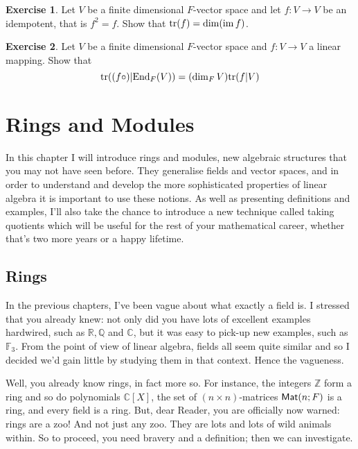 \documentclass[11pt]{amsbook}
\DeclareMathOperator{\im}{\mathrm{im}}
\theoremstyle{definition}
\newtheorem{exercise}{Exercise}
\begin{document}
\begin{exercise}
Let $V$ be a finite dimensional $F$-vector space and let $f:V\to V$ be an idempotent, that is $f^2 = f$. Show that ${\rm tr}(f) = \dim (\im f)$.
\end{exercise}

\begin{exercise}
Let $V$ be a finite dimensional $F$-vector space and $f:V \to V$ a linear mapping. Show that $${\rm tr}((f\circ )|{\rm End}_F(V)) = (\dim_F V){\rm tr}(f|V)$$
\end{exercise}
\chapter{Rings and Modules}
In this chapter I will introduce rings and modules, new algebraic structures that you may not have seen before. They generalise fields and vector spaces, and in order to understand and develop the more sophisticated properties of linear algebra it is important to use these notions. As well as presenting definitions and examples, I'll also take the chance to introduce a new technique called taking quotients which will be useful for the rest of your mathematical career, whether that's two more years or a happy lifetime.

\section{Rings}
In the previous chapters, I've been vague about what exactly a field is. I stressed that you already knew: not only did you have lots of excellent examples hardwired, such as $\mathbb{R}, \mathbb{Q}$ and $\mathbb{C}$, but it was easy to pick-up new examples, such as $\mathbb{F}_3$. From the point of view of linear algebra, fields all seem quite similar and so I decided we'd gain little by studying them in that context. Hence the vagueness.

Well, you already know rings, in fact more so. For instance, the integers $\mathbb{Z}$ form a ring and so do polynomials $\mathbb{C}[X]$, the set of $(n\times n)$-matrices ${\sf Mat}(n; F)$ is a ring, and every field is a ring. But, dear Reader, you are officially now warned: rings are a zoo! And not just any zoo. They are lots and lots of wild animals within. So to proceed, you need bravery and a definition; then we can investigate.
\end{document}
